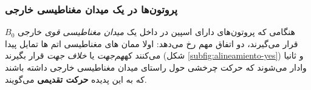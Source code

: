 \subsubsection{پروتون‌ها در یک میدان مغناطیسی خارجی}


هنگامی که پروتون‌های دارای اسپین در داخل یک \textit{میدان مغناطیسی قوی }
خارجی $B_0$ قرار می‌گیرند، دو اتفاق مهم رخ می‌دهد: اولا ممان های مغناطیسی اتم ها تمایل پیدا می‌کنند که\textit{هم‌جهت} یا \textit{خلاف جهت} 
قرار بگیرند (شکل \ref{subfig:alineamiento-yes})
و ثانیا وادار می‌شوند که حرکت چرخشی حول راستای میدان مغناطیسی خارجی داشته باشند که به این پدیده \textbf{حرکت تقدیمی}
می‌گویند. 

\begin{figure}
	\centering{}
	\caption{}
	\label{fig:zeeman-diagram}
\end{figure}


